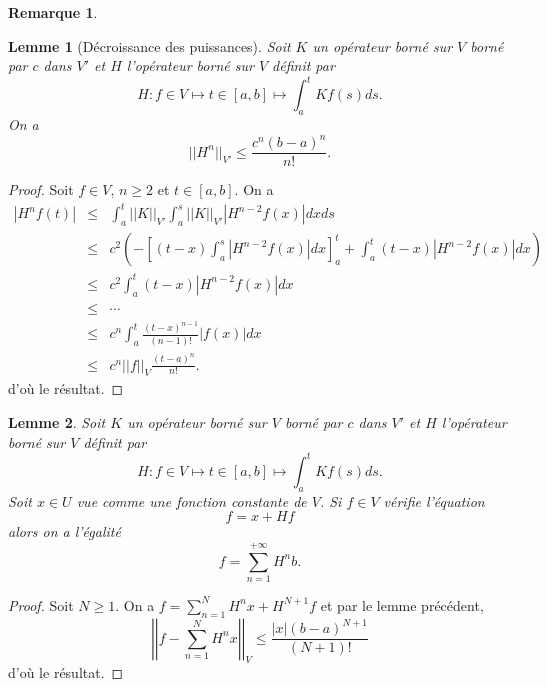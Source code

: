 \documentclass[12pt,openany,a4paper, titlepage]{article}
\newcommand{\f}[2]{\frac{#1}{#2}}
\newcommand{\lp}{\left(}
\newcommand{\rp}{\right)}
\newcommand{\lb}{\left|}
\newcommand{\rb}{\right|}
\newcommand{\lc}{\left[}
\newcommand{\rcc}{\right]}
\newcommand{\suminf}[2]{\sum_{#1=#2}^{+\infty}}
\newtheorem{lem}{Lemme}
\theoremstyle{definition}
\theoremstyle{definition}
\theoremstyle{definition}
\theoremstyle{definition}
\theoremstyle{definition}
\newtheorem{rem}{Remarque}
\theoremstyle{definition}
\begin{document}
\begin{rem}
\begin{lem}[Décroissance des puissances]
Soit $K$ un opérateur borné sur $V$ borné par $c$ dans $V'$ et $H$ l'opérateur borné sur $V$ définit par 
$$H :f\in V \mapsto t\in[a,b] \mapsto \int_a^t Kf(s)ds.$$
On a 
\begin{equation}
    ||H^n||_{V'} \leq \f{c^n(b-a)^n}{n!}.
\end{equation}
\end{lem}

\begin{proof}
Soit $f\in V$, $n\geq 2$ et $t\in[a,b]$. On a 
\begin{eqnarray}
    |H^nf(t)| &\leq&  \int_a^t ||K||_{V'}\int_a^s||K||_{V'}|H^{n-2}f(x)|dxds \\
              &\leq& c^2 \lp -\lc (t-x)\int_a^s|H^{n-2}f(x)|dx\rcc_a^t + \int_a^t(t-x)|H^{n-2}f(x)|dx\rp \\
              &\leq& c^2 \int_a^t(t-x)|H^{n-2}f(x)|dx \\
              &\leq& \cdots \\
              &\leq& c^n \int_a^t\f{(t-x)^{n-1}}{(n-1)!}|f(x)|dx \\
              &\leq& c^n ||f||_V \f{(t-a)^n}{n!}.
\end{eqnarray}
d'où le résultat.
\end{proof}

\begin{lem}
Soit $K$ un opérateur borné sur $V$ borné par $c$ dans $V'$ et $H$ l'opérateur borné sur $V$ définit par 
$$H :f\in V \mapsto t\in[a,b] \mapsto \int_a^t Kf(s)ds.$$ Soit $x\in U$ vue comme une fonction constante de $V$. Si $f\in V$ vérifie l'équation 
$$ f = x + Hf$$
alors on a l'égalité 
$$ f = \suminf{n}{1} H^nb.$$
\end{lem}

\begin{proof}
Soit $N\geq 1$. On a $f = \sum_{n=1}^{N} H^nx + H^{N+1}f$ et par le lemme précédent, $$\lb\lb  f - \sum_{n=1}^{N} H^nx\rb\rb_V \leq \f{|x|(b-a)^{N+1}}{(N+1)!}$$ d'où le résultat.
\end{proof}


\end{rem}
\end{document}
